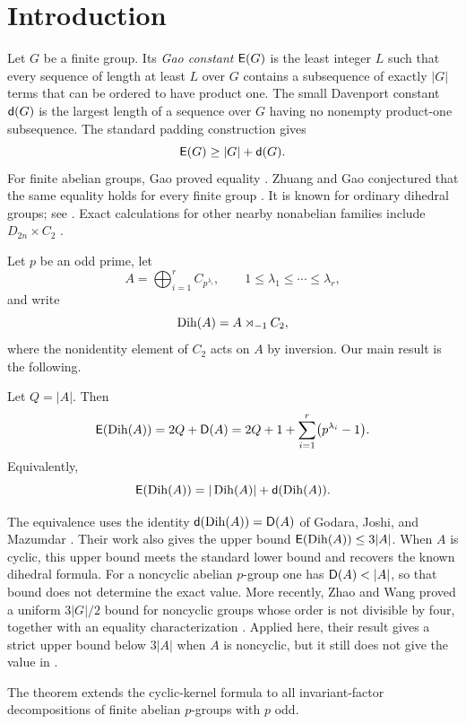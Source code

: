 \section{Introduction}\label{sec:introduction}

Let \(G\) be a finite group. Its \emph{Gao constant} \(\mathsf E(G)\) is the
least integer \(L\) such that every sequence of length at least \(L\)
over \(G\) contains a subsequence of exactly \(|G|\) terms that can be
ordered to have product one. The small Davenport constant
\(\mathsf d(G)\) is the largest length of a sequence over \(G\) having no
nonempty product-one subsequence. The standard padding construction
gives
\[
  \mathsf E(G)\ge |G|+\mathsf d(G).
\]
For finite abelian groups, Gao proved equality
\cite{Gao1996}. Zhuang and Gao conjectured that the same equality holds
for every finite group \cite{ZhuangGao2005}. It is known for ordinary
dihedral groups; see \cite{ZhuangGao2005,Bass2007,GaoLu2008}. Exact
calculations for other nearby nonabelian families include
\(D_{2n}\times C_2\) \cite{BrocheroLemosMoriyaRibas2023}.

Let \(p\) be an odd prime, let
\[
  A=\bigoplus_{i=1}^{r} C_{p^{\lambda_i}},
  \qquad 1\le \lambda_1\le\cdots\le\lambda_r,
\]
and write
\[
  \operatorname{Dih}(A)=A\rtimes_{-1}C_2,
\]
where the nonidentity element of \(C_2\) acts on \(A\) by inversion.
Our main result is the following.

\begin{theorem}\label{thm:main}
Let \(Q=|A|\). Then
\[
  \mathsf E(\operatorname{Dih}(A))=2Q+\mathsf D(A)
  =2Q+1+\sum_{i=1}^{r}\bigl(p^{\lambda_i}-1\bigr).
\]
Equivalently,
\[
  \mathsf E(\operatorname{Dih}(A))=|\operatorname{Dih}(A)|+\mathsf d(\operatorname{Dih}(A)).
\]
\end{theorem}

The equivalence uses the identity
\(\mathsf d(\operatorname{Dih}(A))=\mathsf D(A)\) of Godara, Joshi, and Mazumdar
\cite{GodaraJoshiMazumdar2026}. Their work also gives the upper bound
\(\mathsf E(\operatorname{Dih}(A))\le 3|A|\). When \(A\) is cyclic, this upper bound meets
the standard lower bound and recovers the known dihedral formula. For a
noncyclic abelian \(p\)-group one has \(\D(A)<|A|\), so that bound does
not determine the exact value. More recently, Zhao and Wang proved a
uniform \(3|G|/2\) bound for noncyclic groups whose order is not
divisible by four, together with an equality characterization
\cite{ZhaoWang2027}. Applied here, their result gives a strict upper
bound below \(3|A|\) when \(A\) is noncyclic, but it still does not give
the value in .

The theorem extends the cyclic-kernel formula to all invariant-factor
decompositions of finite abelian \(p\)-groups with \(p\) odd.

